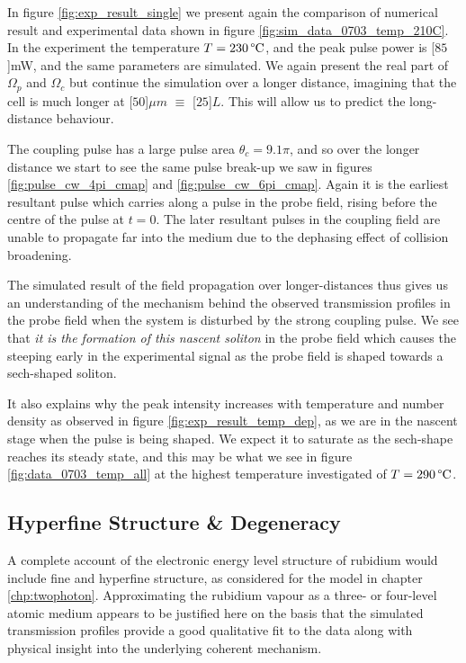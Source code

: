     In figure \ref{fig:exp_result_single} we present again the comparison of
    numerical result and experimental data shown in figure
    \ref{fig:sim_data_0703_temp_210C}. In the experiment the temperature $T =
    \unit[230]{\textrm{\textdegree C}}$, and the peak pulse power is
    \unit[$85$]{mW}, and the same parameters are simulated. We again present the
    real part of $\Omega_p$ and $\Omega_c$ but continue the simulation over a
    longer distance, imagining that the cell is much longer at \unit[$50$]{$\mu
    m$} $ \equiv$ \unit[$25$]{$L$}. This will allow us to predict the long-
    distance behaviour.

    The coupling pulse has a large pulse area $\theta_c = 9.1 \pi$, and so over
    the longer distance we start to see the same pulse break-up we saw in
    figures \ref{fig:pulse_cw_4pi_cmap} and \ref{fig:pulse_cw_6pi_cmap}. Again
    it is the earliest resultant pulse which carries along a pulse in the probe
    field, rising before the centre of the pulse at $t = 0$. The later resultant
    pulses in the coupling field are unable to propagate far into the medium due
    to the dephasing effect of collision broadening.

    The simulated result of the field propagation over longer-distances thus
    gives us an understanding of the mechanism behind the observed transmission
    profiles in the probe field when the system is disturbed by the strong
    coupling pulse. We see that \textit{it is the formation of this nascent
    soliton} in the probe field which causes the steeping early in the
    experimental signal as the probe field is shaped towards a sech-shaped
    soliton.

    It also explains why the peak intensity increases with temperature and
    number density as observed in figure \ref{fig:exp_result_temp_dep}, as we
    are in the nascent stage when the pulse is being shaped. We expect it to
    saturate as the sech-shape reaches its steady state, and this may be what we
    see in figure \ref{fig:data_0703_temp_all} at the highest temperature
    investigated of $T = \unit[290]{\textrm{\textdegree C}}$.

  \subsection{Hyperfine Structure \& Degeneracy}

    A complete account of the electronic energy level structure of rubidium
    would include fine and hyperfine structure, as considered for the model in
    chapter \ref{chp:twophoton}. Approximating the rubidium vapour as a three-
    or four-level atomic medium appears to be justified here on the basis that
    the simulated transmission profiles provide a good qualitative fit to the
    data along with physical insight into the underlying coherent mechanism.

